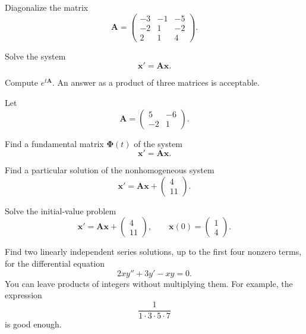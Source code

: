 \begin{problem}
Diagonalize the matrix
\[
\mathbf A=
\begin{pmatrix}
-3&-1&-5\\
-2&1&-2\\
2&1&4
\end{pmatrix}.
\]
\begin{problemsubparts}
\item Solve the system
\[
\mathbf x'=\mathbf A\mathbf x.
\]
\item Compute $e^{t\mathbf A}$. An answer as a product of three matrices is acceptable.
\end{problemsubparts}
\end{problem}

\begin{problem}
Let
\[
\mathbf A=
\begin{pmatrix}
5&-6\\
-2&1
\end{pmatrix}.
\]
\begin{problemsubparts}
\item Find a fundamental matrix $\boldsymbol{\Phi}(t)$ of the system
\[
\mathbf x'=\mathbf A\mathbf x.
\]
\item Find a particular solution of the nonhomogeneous system
\[
\mathbf x'=\mathbf A\mathbf x+
\begin{pmatrix}
4\\
11
\end{pmatrix}.
\]
\item Solve the initial-value problem
\[
\mathbf x'=\mathbf A\mathbf x+
\begin{pmatrix}
4\\
11
\end{pmatrix},
\qquad
\mathbf x(0)=
\begin{pmatrix}
1\\
4
\end{pmatrix}.
\]
\end{problemsubparts}
\end{problem}

\begin{problem}
Find two linearly independent series solutions, up to the first four nonzero terms, for the differential equation
\[
2xy''+3y'-xy=0.
\]
You can leave products of integers without multiplying them. For example, the expression
\[
\frac{1}{1\cdot3\cdot5\cdot7}
\]
is good enough.
\end{problem}

